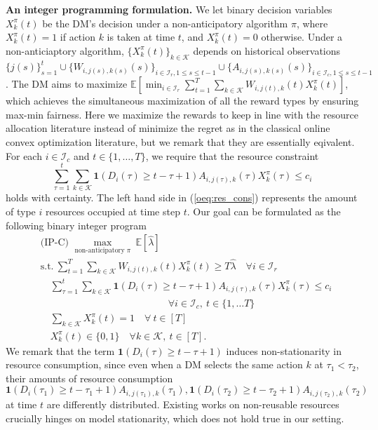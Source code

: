 \documentclass[letterpaper, 10 pt, conference]{ieeeconf}  %
\newcommand{\III}{\mathcal{I}}
\newcommand{\KKK}{\mathcal{K}}
\theoremstyle{plain}
\theoremstyle{definition}
\theoremstyle{remark}
\begin{document}
\textbf{An integer programming formulation.} We let binary decision variables $X^\pi_k(t)$ be the DM's decision under a non-anticipatory algorithm $\pi$, where $X^\pi_k(t) =1$ if action $k$ is taken at time $t$, and $X^\pi_k(t) =0$ otherwise. Under a non-anticiaptory algorithm, $\{X^\pi_k(t)\}_{k\in \KKK}$ depends on historical observations $\{j(s)\}^{t}_{s=1} \cup \{W_{i, j(s), k(s)}(s)\}_{i\in \III_r, 1\leq s\leq t-1} \cup \{A_{i, j(s), k(s)}(s)\}_{i\in \III_c, 1\leq s\leq t-1}$. The DM aims to maximize $\mathbb{E}[\min_{i \in \III_r} \sum^T_{t=1} \sum_{k\in \KKK} W_{i,j(t),k}(t) X^\pi_{k}(t)]$, which achieves the simultaneous maximization of all the reward types by ensuring max-min fairness. Here we maximize the rewards to keep in line with the resource allocation literature instead of minimize the regret as in the classical online convex optimization literature, but we remark that they are essentially eqivalent. For each $i \in \III_c$ and $t \in \{1,\ldots,T\}$, we require that the resource constraint
\begin{equation}
\sum^t_{\tau = 1} \sum_{k\in \KKK} \mathbf{1}( D_i(\tau) \geq t - \tau + 1) A_{i,j(\tau),k}(\tau) X^\pi_{k}(\tau) \leq c_i \label{oeq:res_cons}
\end{equation} 
holds with certainty. The left hand side in (\ref{oeq:res_cons}) represents the amount of type $i$ resources occupied at time step $t$. Our goal can be formulated as the following binary integer program
\begin{subequations}
\begin{alignat}{2}
&\text{(IP-C) } \max\limits_{\text{non-anticipatory }\pi}  ~\mathbb{E}[\hat{\lambda}] \nonumber\\
&\text{s.t.}  ~\sum^T_{t=1} \sum_{k\in \KKK} W_{i,j(t),k}(t) X^\pi_{k}(t)\geq T\hat{\lambda}     \quad \forall i\in \III_r   \nonumber\\
&\quad \sum^t_{\tau = 1} \sum_{k\in \KKK} \mathbf{1}( D_i(\tau) \geq t - \tau + 1) A_{i,j(\tau),k}(\tau) X^\pi_{k}(\tau) \leq c_i \nonumber\\
&\quad \quad \quad \quad \quad \quad \quad \quad \quad \quad \quad \quad \quad \forall i\in \III_c,~ t\in \{1, \ldots T\} \nonumber\\
&\quad \sum_{k\in \KKK} X^\pi_k(t) = 1 \quad \forall ~ t\in [T] \nonumber\\
&\quad X^\pi_k(t) \in \{0,1\}      \quad \forall k\in \KKK,~ t\in [T] \nonumber.
\end{alignat}
\end{subequations}
We remark that the term $\mathbf{1}( D_i(\tau) \geq t - \tau + 1)$ induces non-stationarity in resource consumption, since even when a DM selects the same action $k$ at $\tau_1< \tau_2$, their amounts of resource consumption $\mathbf{1}( D_i(\tau_1) \geq t - \tau_1 + 1)A_{i,j(\tau_1),k}(\tau_1), \mathbf{1}( D_i(\tau_2) \geq t - \tau_2 + 1) A_{i,j(\tau_2),k}(\tau_2)$ at time $t$ are differently distributed. Existing works on non-reusable resources crucially hinges on model stationarity, which does not hold true in our setting. 
\end{document}
